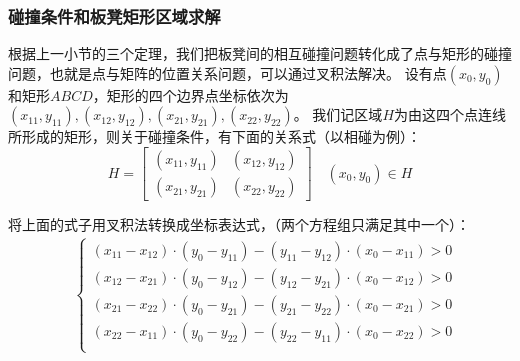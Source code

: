 \documentclass{cumcmthesis1}
\begin{document}
\subsubsection{碰撞条件和板凳矩形区域求解}
\par
根据上一小节的三个定理，我们把板凳间的相互碰撞问题转化成了点与矩形的碰撞问题，也就是点与矩阵的位置关系问题，可以通过叉积法解决。
设有点$ (x_0,y_0)$和矩形$ABCD$，矩形的四个边界点坐标依次为
$(x_{11}, y_{11}),(x_{12}, y_{12}),(x_{21}, y_{21}),(x_{22}, y_{22})$。
我们记区域$H$为由这四个点连线所形成的矩形，则关于碰撞条件，有下面的关系式（以相碰为例）：
\begin{equation}
    H= \begin{bmatrix}
        (x_{11}, y_{11}) & (x_{12}, y_{12}) \\
        (x_{21}, y_{21}) & (x_{22}, y_{22})
        \end{bmatrix}
        \quad (x_0,y_0) \in H
\end{equation}
\par
将上面的式子用叉积法转换成坐标表达式，（两个方程组只满足其中一个）：
\begin{equation}
    \begin{aligned}
        &\begin{cases}
            (x_{11} - x_{12}) \cdot (y_{0} - y_{11}) - (y_{11} - y_{12}) \cdot (x_{0} - x_{11}) > 0 \\
            (x_{12} - x_{21}) \cdot (y_{0} - y_{12}) - (y_{12} - y_{21}) \cdot (x_{0} - x_{12}) > 0 \\
            (x_{21} - x_{22}) \cdot (y_{0} - y_{21}) - (y_{21} - y_{22}) \cdot (x_{0} - x_{21}) > 0 \\
            (x_{22} - x_{11}) \cdot (y_{0} - y_{22}) - (y_{22} - y_{11}) \cdot (x_{0} - x_{22}) > 0 \\
        \end{cases} 
    \end{aligned}
\end{equation}
    
\end{document}
